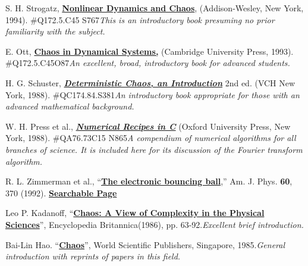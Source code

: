 \documentclass{../lab}
\begin{document}
\begingroup
\renewcommand{\addcontentsline}[3]{}%
\renewcommand{\section}[2]{}%
\begin{thebibliography}{}
     S. H. Strogatz, \href{http://physics111.lib.berkeley.edu/Physics111/Reprints/NLD/Strogatz_Nonlinear_dynamics_n_chaos.pdf}{\textbf{Nonlinear Dynamics and Chaos}}, (Addison-Wesley, New York, 1994). \#Q172.5.C45 S767\emph{This is an introductory book presuming no prior familiarity with the subject.}

     E. Ott, \href{http://experimentationlab.berkeley.edu/sites/default/files/chaosindynamicalsystems.pdf}{\textbf{Chaos in Dynamical Systems,}} (Cambridge University Press, 1993). \#Q172.5.C45O87\emph{An excellent, broad, introductory book for advanced students.}

     H. G. Schuster, \emph{\href{http://physics111.lib.berkeley.edu/Physics111/Reprints/NLD/13-Shannons\_Measure\_of\_Information.pdf}{\textbf{Deterministic Chaos, an Introduction}}} 2nd ed. (VCH New York, 1988). \#QC174.84.S381\emph{An introductory book appropriate for those with an advanced mathematical background.}

     W. H. Press et al., \emph{\href{http://physics111.lib.berkeley.edu/Physics111/Reprints/NLD/11-Fourier\_Transform\_Spectral\_Methods.pdf}{\textbf{Numerical Recipes in C}}} (Oxford University Press, New York, 1988). \#QA76.73C15 N865\emph{A compendium of numerical algorithms for all branches of science. It is included here for its discussion of the Fourier transform algorithm.}

     R. L. Zimmerman et al., ``\href{http://ajp.aapt.org/resource/1/ajpias/v60/i4/p370\_s1}{\textbf{The electronic bouncing ball}},'' Am. J. Phys. \textbf{60}, 370 (1992). \href{http://physics111.lib.berkeley.edu/Physics111/Reprints/NLD/14-Electronic\_Bouncing\_Ball.pdf}{\textbf{Searchable Page}}

     Leo P. Kadanoff, ``\href{http://physics111.lib.berkeley.edu/Physics111/Reprints/NLD/01-Chaos-A\_View\_of\_Complexity.pdf}{\textbf{Chaos: A View of Complexity in the Physical Sciences}}'', Encyclopedia Britannica(1986), pp. 63-92.\emph{Excellent brief introduction.}

     Bai-Lin Hao. ``\href{http://physics111.lib.berkeley.edu/Physics111/Reprints/NLD/02-Chaos.pdf}{\textbf{Chaos}}'', World Scientific Publishers, Singapore, 1985.\emph{General introduction with reprints of papers in this field.}


\end{thebibliography}
\end{document}

